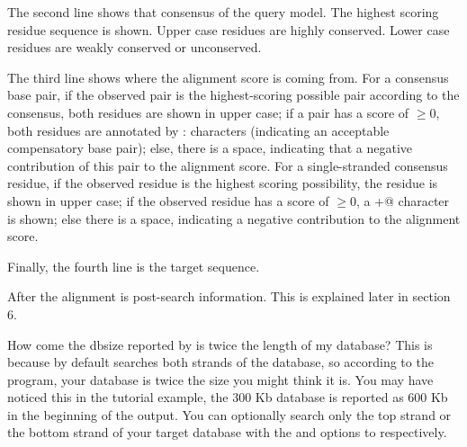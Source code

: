 The second line shows that consensus of the query model. The highest
scoring residue sequence is shown. Upper case residues are highly
conserved. Lower case residues are weakly conserved or unconserved.

The third line shows where the alignment score is coming from. For a
consensus base pair, if the observed pair is the highest-scoring
possible pair according to the consensus, both residues are shown in
upper case; if a pair has a score of $\geq 0$, both residues are
annotated by : characters (indicating an acceptable compensatory base
pair); else, there is a space, indicating that a negative contribution
of this pair to the alignment score. For a single-stranded consensus
residue, if the observed residue is the highest scoring possibility,
the residue is shown in upper case; if the observed residue has a
score of $\geq 0$, a \verb@+@ character is shown; else there is a
space, indicating a negative contribution to the alignment score.

Finally, the fourth line is the target sequence.

After the alignment is post-search information. This is explained
later in section 6. 

\begin{srefaq}{How come the dbsize reported by  is
twice the length of my database?} This is because by default
   searches both strands of the database, so according
  to the program, your database is twice the size you might think it
  is. You may have noticed this in the tutorial example, the 300 Kb
  database is reported as 600 Kb in the beginning of the
   output. You can optionally search only the top
  strand or the bottom strand of your target database with the
   and  options to 
  respectively. 
\end{srefaq}

